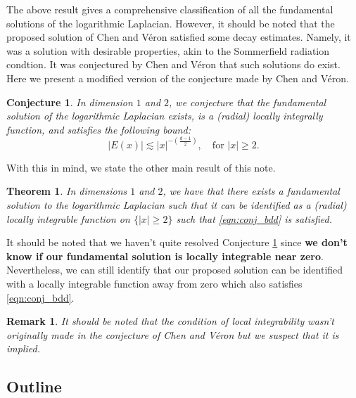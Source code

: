 \documentclass[11pt]{amsart}
\newtheorem{theorem}{Theorem}
\newtheorem{remark}{Remark}
\newtheorem{conjecture}{Conjecture}
\begin{document}
The above result gives a comprehensive classification of all the fundamental solutions of the logarithmic Laplacian. However, it should be noted that the proposed solution of Chen and V\'eron satisfied some decay estimates. Namely, it was a solution with desirable properties, akin to the Sommerfield radiation condtion. It was conjectured by Chen and V\'eron that such solutions do exist. Here we present a modified version of the conjecture made by Chen and V\'eron.

\begin{conjecture}\cite{MR4741033}\label{conjecture:chen_veron}
	In dimension $1$ and $2$, we conjecture that the fundamental solution of the logarithmic Laplacian exists, is a (radial) locally integrally function, and satisfies the following bound:
	\begin{equation}\label{eqn:conj_bdd}
		|E(x)|\lesssim |x|^{-\left (\frac{d-1}{2}\right )}, \quad \text{for $|x|\geq 2$.}
	\end{equation}
\end{conjecture}

With this in mind, we state the other main result of this note. 

\begin{theorem}\label{thm:main_2}
	In dimensions $1$ and $2$, we have that there exists a fundamental solution to the logarithmic Laplacian such that it can be identified as a (radial) locally integrable function on $\{|x|\geq 2\}$ such that \eqref{eqn:conj_bdd} is satisfied. 
\end{theorem}

It should be noted that we haven't quite resolved Conjecture \ref{conjecture:chen_veron} since \textbf{we don't know if our fundamental solution is locally integrable near zero}. Nevertheless, we can still identify that our proposed solution can be identified with a locally integrable function away from zero which also satisfies \eqref{eqn:conj_bdd}. 
 
\begin{remark}
	It should be noted that the condition of local integrability wasn't originally made in the conjecture of Chen and V\'eron but we suspect that it is implied.
\end{remark}



\subsection{Outline}
\end{document}
